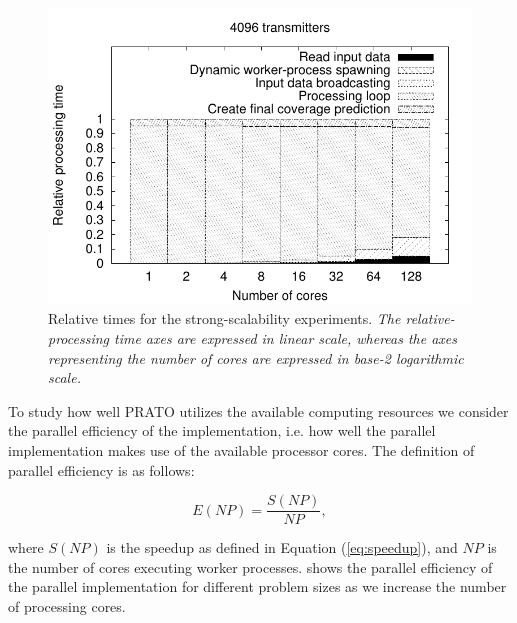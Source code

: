 \begin{figure}
\begin{minipage}[t]{0.31\textwidth}
\includegraphics[width=1\columnwidth]{04-framework_design_and_implementation/img/strong_scaling-relative_time_plot_4096}%
\end{minipage}

\caption{Relative times for the strong-scalability experiments.\emph{ }\textit{\emph{The
relative-processing time axes are expressed in linear scale, whereas
the axes representing the number of cores are expressed in base-2
logarithmic scale.\label{fig:strong_scaling-relative_times}}}}
\end{figure}


To study how well PRATO utilizes the available computing resources
we consider the parallel efficiency of the implementation, i.e. how
well the parallel implementation makes use of the available processor
cores. The definition of parallel efficiency is as follows:

\begin{equation}
E(NP)=\frac{S(NP)}{NP},
\end{equation}


\noindent where $S(NP)$ is the speedup as defined in Equation (\ref{eq:speedup}),
and $NP$ is the number of cores executing worker processes. 
shows the parallel efficiency of the parallel implementation for different
problem sizes as we increase the number of processing cores. 


